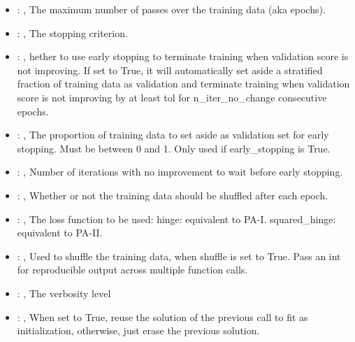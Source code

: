 \begin{itemize}
    \item {}: ,
      The maximum number of passes over the training data (aka epochs).

    \item {}: ,
      The stopping criterion.

    \item {}: ,
      hether to use early stopping to terminate training when validation score is not
      improving. If set to True, it will automatically set aside a stratified fraction of training
      data as validation and terminate training when validation score is not improving by at least
      tol for n\_iter\_no\_change consecutive epochs.

    \item {}: ,
      The proportion of training data to set aside as validation set for early stopping.
      Must be between 0 and 1. Only used if early\_stopping is True.

    \item {}: ,
      Number of iterations with no improvement to wait before early stopping.

    \item {}: ,
      Whether or not the training data should be shuffled after each epoch.

    \item {}: ,
      The loss function to be used: hinge: equivalent to PA-I.
      squared\_hinge: equivalent to PA-II.

    \item {}: ,
      Used to shuffle the training data, when shuffle is set to
      True. Pass an int for reproducible output across multiple function calls.

    \item {}: ,
      The verbosity level

    \item {}: ,
      When set to True, reuse the solution of the previous call
      to fit as initialization, otherwise, just erase the previous solution.
  \end{itemize}


